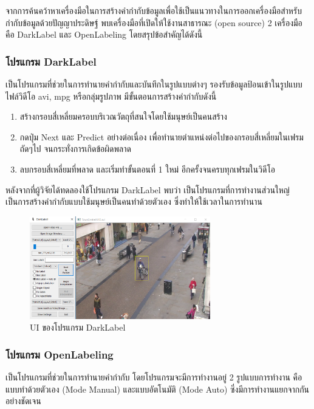 จากการค้นคว้าหาเครื่องมือในการสร้างคำกำกับข้อมูลเพื่อใช้เป็นแนวทางในการออกเครื่องมือสำหรับกำกับข้อมูลด้วยปัญญาประดิษฐ์ พบเครื่องมือที่เปิดให้ใช้งานสาธารณะ (open source) 2 เครื่องมือ 
คือ DarkLabel และ OpenLabeling โดยสรุปข้อสำคัญได้ดังนี้ 
\subsubsection*{โปรแกรม DarkLabel}
เป็นโปรแกรมที่ช่วยในการทำนายคำกำกับและบันทึกในรูปแบบต่างๆ รองรับข้อมูลป้อนเข้าในรูปแบบไฟล์วิดีโอ avi, mpg หรือกลุ่มรูปภาพ มีขั้นตอนการสร้างคำกำกับดังนี้ 
\begin{enumerate}
	\setlength\itemsep{-0.25em}
	\item สร้างกรอบสี่เหลี่ยมครอบบริเวณวัตถุที่สนใจโดยใช้มนุษย์เป็นคนสร้าง
	\item กดปุ่ม Next และ Predict อย่างต่อเนื่อง เพื่อทำนายตำแหน่งต่อไปของกรอบสี่เหลี่ยมในเฟรมถัดๆไป จนกระทั่งการเกิดข้อผิดพลาด
	\item ลบกรอบสี่เหลี่ยมที่พลาด และเริ่มทำขั้นตอนที่ 1 ใหม่ อีกครั้งจนครบทุกเฟรมในวิดีโอ
\end{enumerate}
หลังจากที่ผู้วิจัยได้ทดลองใช้โปรแกรม DarkLabel พบว่า เป็นโปรแกรมที่การทำงานส่วนใหญ่เป็นการสร้างคำกำกับแบบใช้มนุษย์เป็นคนทำด้วยตัวเอง ซึ่งทำให้ใช้เวลาในการทำนาน

\begin{figure}[!ht]
	\centering
	\includegraphics[width=0.7\textwidth]{chapter2/images/darklabel.png}
		\caption{UI ของโปรแกรม DarkLabel}
    	\label{fig:darklabel}
\end{figure}
\clearpage

\subsubsection*{โปรแกรม OpenLabeling}
เป็นโปรแกรมที่ช่วยในการทำนายคำกำกับ โดยโปรแกรมจะมีการทำงานอยู่ 2 รูปแบบการทำงาน คือแบบทำด้วยตัวเอง (Mode Manual) และแบบอัตโนมัติ (Mode Auto) ซึ่งมีการทำงานแยกจากกันอย่างชัดเจน 

